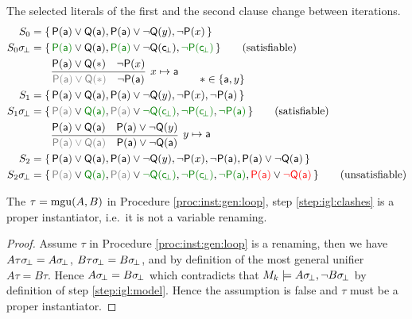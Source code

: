 \begin{example} The selected literals of the first and the second clause change between iterations.
\begin{align*}
S_0 &= \{\,
	\mP(\ma)\lor\mQ(\ma),
	\mP(\ma)\lor\lnot\mQ(y),
	\lnot\mP(x)
\,\}
\\
S_0\subsbot &=\{\,
	{\colHi\mP(\ma)}\lor\mQ(\ma),
	{\colHi\mP(\ma)}\lor\lnot\mQ(\consbot),
	{\colHi\lnot\mP(\consbot)}
\,\}
\tag{satisfiable}
\\
&\qquad\infer[
	x\mapsto\ma
	]{
		{\colG \mP(\ma)\lor\mQ(\ast)}\quad\lnot\mP(\ma)
	}{
		\mP(\ma)\lor\mQ(\ast) & \lnot\mP(x)
	}
\tag*{\(\ast\in\{\ma,y\}\)}
\\
S_1 &=\{\,
	\mP(\ma)\lor\mQ(\ma),
	\mP(\ma)\lor\lnot\mQ(y),
	\lnot\mP(x),
	\lnot\mP(\ma)
\,\}
\\
S_1\subsbot &=\{\,
	{\colG\mP(\ma)}\lor{\colHi\mQ(\ma)},
	{\colG\mP(\ma)}\lor{\colHi\lnot\mQ(\consbot)},
	{\colHi\lnot\mP(\consbot)},
	{\colHi\lnot\mP(\ma)}
\,\}
\tag{satisfiable}
\\
&\qquad\infer[
y\mapsto\ma
]{
	{\colG \mP(\ma)\lor\mQ(\ma)}\quad\mP(\ma)\lor\lnot\mQ(\ma)
}{
	\mP(\ma)\lor\mQ(\ma) & \mP(\ma)\lor\lnot\mQ(y)
}
\\
S_2 &=\{\,
\mP(\ma)\lor\mQ(\ma),
\mP(\ma)\lor\lnot\mQ(y),
\lnot\mP(x),
\lnot\mP(\ma),
\mP(\ma)\lor\lnot\mQ(\ma)
\,\}
\\
S_2\subsbot &=\{\,
{\colG\mP(\ma)}\lor{\colHi\mQ(\ma)},
{\colG\mP(\ma)}\lor{\colHi\lnot\mQ(\consbot)},
{\colHi\lnot\mP(\consbot)},
{\colHi\lnot\mP(\ma)},
{\colLo\mP(\ma)}\lor{\colLo\lnot\mQ(\ma)}
\,\}
\tag{unsatisfiable}
\end{align*}
\end{example}

\begin{lemma}
	The \(\tau = \operatorname{mgu}(A,B)\) in Procedure \ref{proc:inst:gen:loop},
	step \ref{step:igl:clashes} is a proper instantiator,
	i.e.~it is not a variable renaming.
\end{lemma}
\begin{proof}
	Assume \(\tau\) in Procedure \ref{proc:inst:gen:loop}
	is a renaming, then we have
	\(A\tau\sigma\!_\bot = A\sigma\!_\bot\),
	\(B\tau\sigma\!_\bot = B\sigma\!_\bot\),
	and by definition of the most general unifier \(A\tau = B\tau\).
	Hence \(A\sigma\!_\bot = B\sigma\!_\bot\) which contradicts that
	\(M_k\models A\sigma\!_\bot, \lnot B\sigma\!_\bot\)
	by definition of step \ref{step:igl:model}.
	Hence the assumption is false and \(\tau\) must be a proper instantiator.
\end{proof}





